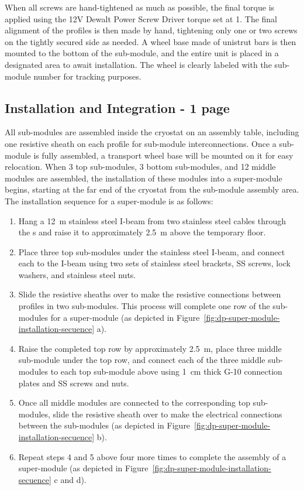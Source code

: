 When all screws are hand-tightened as much as possible, the final torque is applied using the 12V Dewalt Power Screw Driver torque set at 1.  The final alignment of the profiles is then made by hand, tightening only one or two screws on the tightly secured side as needed.
A wheel base made of unistrut bars is then mounted to the bottom of the sub-module, and the entire unit is placed in a designated area to await installation.   The wheel is clearly labeled with the sub-module number for tracking purposes.

\subsection{Installation and Integration -  1 page}
\label{sec:fddp-hv-transport-install}
All  sub-modules are assembled inside the cryostat on an assembly table, including one resistive sheath on each profile for sub-module interconnections.
Once a sub-module is fully assembled, a transport wheel base will be mounted on it for easy relocation.
When \num{3} top sub-modules, \num{3} bottom sub-modules, and \num{12} middle modules are assembled, the installation of these modules into a super-module begins, starting at the far end of the cryostat from the sub-module assembly area.
The installation sequence for a super-module is as follows:
\begin{enumerate}
    \item Hang a \SI{12}{\m} stainless steel I-beam from two stainless steel cables through the \fdth{}s and raise it to approximately \SI{2.5}{\m} above the temporary floor.
    \item Place three top sub-modules under the stainless steel I-beam, and connect each to the I-beam using two sets of stainless steel brackets, SS screws, lock washers, and stainless steel nuts.  
    \item Slide the resistive sheaths over to make the resistive connections between profiles in two sub-modules. This process will complete one row of the sub-modules for a super-module (as depicted in Figure~\ref{fig:dp-super-module-installation-secuence} a).
    \item Raise the completed top row by approximately \SI{2.5}{\m}, place three middle sub-module under the top row, and connect each of the three middle sub-modules to each top sub-module above using \SI{1}{\cm} thick G-10 connection plates and SS screws and nuts.
    \item Once all middle modules are connected to the corresponding top sub-modules, slide the resistive sheath over to make the electrical connections between the sub-modules (as depicted in Figure~\ref{fig:dp-super-module-installation-secuence} b).
    \item Repeat steps 4 and 5 above four more times to complete the assembly of a super-module (as depicted in Figure~\ref{fig:dp-super-module-installation-secuence} c and d).
\end{enumerate}

